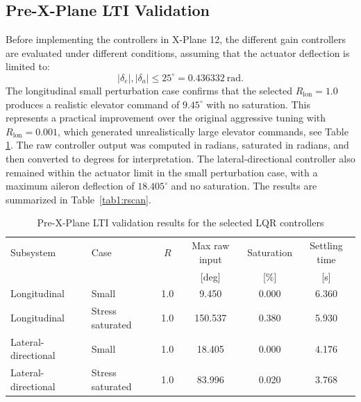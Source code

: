 \documentclass[10pt]{article}
\begin{document}
\subsection{Pre-X-Plane LTI Validation}

Before implementing the controllers in X-Plane 12, the different gain controllers are evaluated under different conditions, assuming that the actuator deflection is limited to:
%
\begin{equation}
    |\delta_e|,|\delta_a| \leq 25^{\circ}
    =
    0.436332~\mathrm{rad}.
\end{equation}
%
The longitudinal small perturbation case confirms that the selected
$R_{\mathrm{lon}}=1.0$ produces a realistic elevator command of
$9.45^{\circ}$ with no saturation. This represents a practical
improvement over the original aggressive tuning with
$R_{\mathrm{lon}}=0.001$, which generated unrealistically large elevator
commands, see Table \ref{tab:lqr_validation_results}. The raw controller output was computed in radians, saturated in radians,
and then converted to degrees for interpretation.
%
The lateral-directional controller also remained within the
actuator limit in the small perturbation case, with a maximum aileron
deflection of $18.405^{\circ}$ and no saturation.
%
The results are summarized in Table~\ref{tab1:rscan}.
\begin{table}[h!]
\centering
\caption{Pre-X-Plane LTI validation results for the selected LQR controllers}
\label{tab:lqr_validation_results}
\begin{tabular}{l l c c c c}
\hline
Subsystem & Case & $R$ & Max raw input & Saturation & Settling time \\
          &      &     & [deg]         & [\%]       & [s] \\
\hline
Longitudinal & Small & 1.0 & 9.450 & 0.000 & 6.360 \\
Longitudinal & Stress saturated & 1.0 & 150.537 & 0.380 & 5.930 \\
Lateral-directional & Small & 1.0 & 18.405 & 0.000 & 4.176 \\
Lateral-directional & Stress saturated & 1.0 & 83.996 & 0.020 & 3.768 \\
\hline
\end{tabular}
\end{table}
\end{document}

